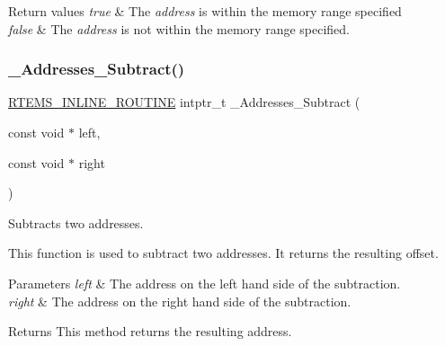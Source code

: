 \begin{DoxyRetVals}{Return values}
{\em true} & The {\itshape address} is within the memory range specified \\
\hline
{\em false} & The {\itshape address} is not within the memory range specified. \\
\hline
\end{DoxyRetVals}
\mbox{\label{group__RTEMSScoreAddress_ga35c4fc0bbdd945fa468c3b8b268005cd}} 
\subsubsection{\texorpdfstring{\_Addresses\_Subtract()}{\_Addresses\_Subtract()}}
{\footnotesize\ttfamily \mbox{\hyperlink{group__RTEMSScoreBaseDefs_gac216239df231d5dbd15e3520b0b9313f}{R\+T\+E\+M\+S\+\_\+\+I\+N\+L\+I\+N\+E\+\_\+\+R\+O\+U\+T\+I\+NE}} intptr\+\_\+t \+\_\+\+Addresses\+\_\+\+Subtract (\begin{DoxyParamCaption}\item[{const void $\ast$}]{left,  }\item[{const void $\ast$}]{right }\end{DoxyParamCaption})}



Subtracts two addresses. 

This function is used to subtract two addresses. It returns the resulting offset.


\begin{DoxyParams}{Parameters}
{\em left} & The address on the left hand side of the subtraction. \\
\hline
{\em right} & The address on the right hand side of the subtraction.\\
\hline
\end{DoxyParams}
\begin{DoxyReturn}{Returns}
This method returns the resulting address. 
\end{DoxyReturn}
\mbox{\label{group__RTEMSScoreAddress_gaf1cfd1def15609368e43e14154b9bf08}} 
